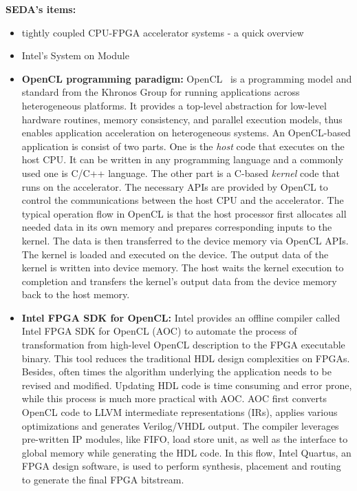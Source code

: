 \textbf{SEDA's items:}
\begin{itemize}
    \item tightly coupled CPU-FPGA accelerator systems - a quick overview 
    \item Intel's System on Module 
    \item \textbf{OpenCL programming paradigm:} OpenCL~\cite{munshi2009opencl} is a programming model and standard from the Khronos Group for running applications across heterogeneous platforms. It provides a top-level abstraction for low-level hardware routines, memory consistency, and parallel execution models, thus enables application acceleration on heterogeneous systems. An OpenCL-based application is consist of two parts. One is the \textit{host} code that executes on the host CPU. It can be written in any programming language and a commonly used one is C/C++ language. The other part is a C-based \textit{kernel} code that runs on the accelerator. The necessary APIs are provided by OpenCL to control the communications between the host CPU and the accelerator. The typical operation flow in OpenCL is that the host processor first allocates all needed data in its own memory and prepares corresponding inputs to the kernel. The data is then transferred to the device memory via OpenCL APIs. The kernel is loaded and executed on the device. The output data of the kernel is written into device memory. The host waits the kernel execution to completion and transfers the kernel's output data from the device memory back to the host memory. 
    \item \textbf{Intel FPGA SDK for OpenCL:} Intel provides an offline compiler called Intel FPGA SDK for OpenCL (AOC) to automate the process of transformation from high-level OpenCL description to the FPGA executable binary. This tool reduces the traditional HDL design complexities on FPGAs. Besides, often times the algorithm underlying the application needs to be revised and modified. Updating HDL code is time consuming and error prone, while this process is much more practical with AOC.  AOC first converts OpenCL code to LLVM intermediate representations (IRs), applies various optimizations and generates Verilog/VHDL output. The compiler leverages pre-written IP modules, like FIFO, load store unit, as well as the interface to global memory while generating the HDL code. In this flow, Intel Quartus, an FPGA design software, is used to perform synthesis, placement and routing to generate the final FPGA bitstream. 

\end{itemize}
